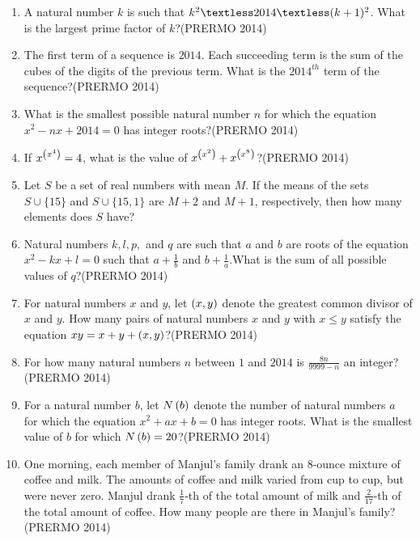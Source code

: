 \begin{enumerate}
   \item A natural number $k$ is such that $k^2 \textless 2014 \textless (k+1)^2$. What is the largest prime factor of $k$?\hfill(PRERMO 2014)
   \item The first term of a sequence is $2014$. Each succeeding term is the sum of the cubes of the digits of the previous term. What is the $2014^{th}$ term of the sequence?\hfill(PRERMO 2014)
   \item What is the smallest possible natural number $n$ for which the equation $x^2 - nx + 2014 = 0$ has integer roots?\hfill(PRERMO 2014)
   \item If $x^{\left(x^4\right)} = 4$, what is the value of $x^{\left(x^2\right)} + x^{\left(x^8\right)}$?\hfill(PRERMO 2014)
   \item Let $S$ be a set of real numbers with mean $M$. If the means of the sets $S \cup \{15\}$ and $S \cup \{15, 1\}$ are $M + 2$ and $M + 1$, respectively, then how many elements does $S$ have?
   \item Natural numbers $k, l, p,$ and $q$ are such that $a$ and $b$ are roots of the equation $x^2 - kx + l = 0$ such that $a + \frac{1}{b}$ and $b + \frac{1}{a}.$What is the sum of all possible values of $q$?\hfill(PRERMO 2014)
   \item For natural numbers $x$ and $y$, let $\left(x, y\right)$ denote the greatest common divisor of $x$ and $y$. How many pairs of natural numbers $x$ and $y$ with $x \leq y$ satisfy the equation $xy = x + y + \left(x, y\right)$?\hfill(PRERMO 2014)
   \item For how many natural numbers $n$ between $1$ and $2014$  is $\frac{8n}{9999 - n}$ an integer?\hfill(PRERMO 2014)
   \item For a natural number $b$, let $N\left(b\right)$ denote the number of natural numbers $a$ for which the equation $x^2 + ax + b = 0$ has integer roots. What is the smallest value of $b$ for which $N\left(b\right) = 20$?\hfill(PRERMO 2014)
    \item One morning, each member of Manjul's family drank an 8-ounce mixture of coffee and milk. The amounts of coffee and milk varied from cup to cup, but were never zero. Manjul drank $\frac{1}{7}$-th of the total amount of milk and $\frac{2}{17}$-th of the total amount of coffee. How many people are there in Manjul's family?\hfill(PRERMO 2014)
\end{enumerate}
